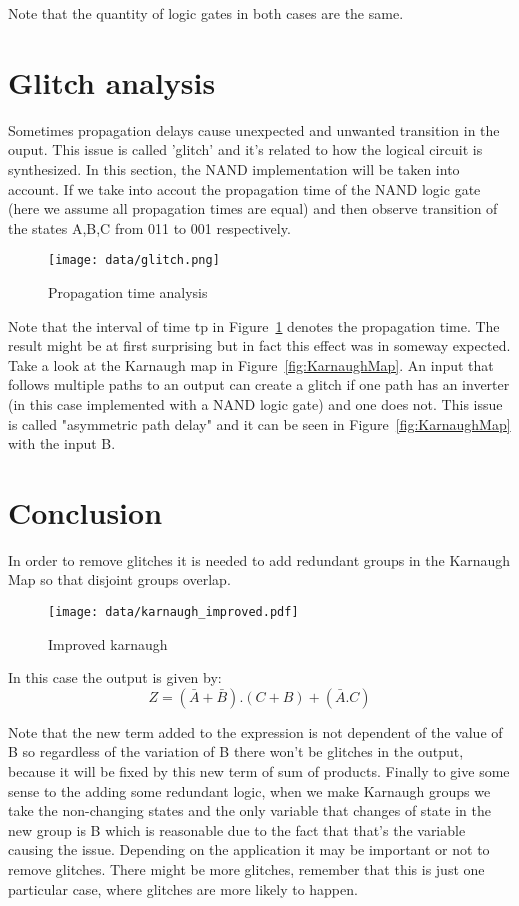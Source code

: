 Note that the quantity of logic gates in both cases are the same.

\section*{Glitch analysis}
Sometimes propagation delays cause unexpected and unwanted transition 
in the ouput. This issue is called 'glitch' and it's related to how 
the logical circuit is synthesized. In this section, the NAND implementation
 will be taken into account.
If we take into accout the propagation time of the NAND logic gate
(here we assume all propagation times are equal) and then observe transition
 of the states A,B,C from 011 to 001 respectively.


\begin{figure}[H] 
    \begin{center}
    \texttt{[image: data/glitch.png]}
    \end{center}
    \caption{Propagation time analysis}
    \label{fig:proptime}
    \end{figure} 
Note that the interval of time tp in Figure~\ref{fig:proptime}  denotes the propagation time.
\linebreak
The result might be at first surprising but  in fact this effect was in someway
expected. Take a look at the Karnaugh map in Figure~\ref{fig:KarnaughMap}.
An input that follows multiple paths to an output can create a glitch if 
one path has an inverter (in this case implemented with a NAND logic gate) 
and one does not. This issue is called "asymmetric path delay" and it can be
seen in Figure~\ref{fig:KarnaughMap} with the input B.

\section*{Conclusion}
In order to remove glitches it is needed to add redundant groups in the
Karnaugh Map so that disjoint groups overlap.
\begin{figure}[H] 
    \begin{center}
    \texttt{[image: data/karnaugh\_improved.pdf]}
    \end{center}
    \caption{Improved karnaugh}
    \label{fig:karnaugh_improved}
    \end{figure} 
In this case the output is given by:
\begin{equation*}
    Z= (\bar{A}+\bar{B}).(C+B)+(\bar{A}.C)    
\end{equation*} 

Note that the new term added to the expression is not dependent
of the value of B so regardless of the variation of B there won't be glitches
in the output, because it will be fixed by this new term of sum of products.
\linebreak
Finally to give some sense to the adding some redundant logic,
when we make Karnaugh groups we take the non-changing states and
the only variable that changes of state in the new group is B
which is reasonable due to the fact that that's the variable 
causing the issue.
Depending on the application it may be important or not to remove
glitches.
There might be more glitches, remember that this is just one particular case,
where glitches are more likely to happen.
